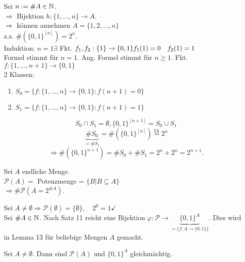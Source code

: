 \documentclass[../ana1.tex]{subfiles}
\begin{document}
\begin{bew}
	Sei \(n := \# A \in\mathbb{N} \).\\
	\(\Rightarrow \) Bijektion \(h:\{1,\ldots,n\} \rightarrow A\).\\
	\( \Rightarrow \) können annehmen \(A = \{1,2,\ldots,n\} \) \\
	z.z. \( \#( {\{0,1\}}^{[n]} ) = 2^n\).\\
	Induktion: \(n=1 \exists \) Fkt. \(f_1,f_2 : \{1\} \rightarrow \{0,1\} \\
	f_1(1) = 0 \quad f_2(1) = 1 \) \\
	Formel stimmt für \(n=1\).
	Ang. Formel stimmt für \(n\geq 1\). Fkt. \(f: \{1,\ldots, n+1\} \rightarrow \{0,1\} \) \\
	2 Klassen:
	\begin{enumerate}
		\item \(S_0 = \{f: \{1,\ldots,n\} \rightarrow \{0,1\}: f(n+1) = 0 \} \)
		\item \(S_1 = \{f: \{1,\ldots,n\} \rightarrow \{0,1\}: f(n+1) = 1 \} \)
	\end{enumerate}
	\[S_0 \cap S_1 = \emptyset, {\{0,1\}}^{[n+1]} = S_0 \cup S_1 \]
	\[\underbrace{\# S_0}_{=\#S_1} = \# ( {\{0,1\}}^{[n]} )  \overset{\text{IA}}{=} 2^n \]
	\[ \Rightarrow \# ( {\{0,1\}}^{n+1} ) = \#S_0+\#S_1 = 2^n + 2^n = 2^{n+1}. \]
\end{bew}
\begin{kor}
	Sei \(A\) endliche Menge. \\
	\(\mathcal{P}(A) = \) Potenzmenge = \( \{B | B \subseteq A\} \) \\
	\(\Rightarrow \#\mathcal{P}(A = 2^{\#A}) \).
\end{kor}
\begin{bew}
	Sei \(A\neq \emptyset \Rightarrow\mathcal{P}(\emptyset) = \{\emptyset \}, \quad 2^0 = 1 \checkmark{}\) \\
	Sei \( \#A \in\mathbb{N} \). Nach Satz 11 reicht eine Bijektion \( \varphi : \mathcal{P} \rightarrow \underbrace{{\{0,1\}}^A}_{= \{f: A \rightarrow \{0,1 \} \}} \). Dies wird in Lemma 13 für beliebige Mengen \(A\) gemacht.
\end{bew}
\begin{lem}
	Sei \(A\neq\emptyset{}\). Dann sind \( \mathcal{P}(A) \) und \( {\{0,1\}}^A \) gleichmächtig.
\end{lem}
\end{document}
